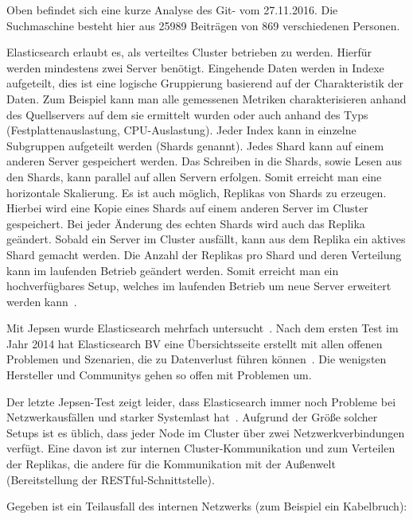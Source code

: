 

Oben befindet sich eine kurze Analyse des \gls{Git}-
 vom 27.11.2016. Die Suchmaschine besteht
hier aus 25989 Beiträgen von 869 verschiedenen Personen.

Elasticsearch erlaubt es, als verteiltes Cluster betrieben zu werden. Hierfür
werden mindestens zwei Server benötigt. Eingehende Daten werden in Indexe
aufgeteilt, dies ist eine logische Gruppierung basierend auf der Charakteristik
der Daten. Zum Beispiel kann man alle gemessenen Metriken charakterisieren
anhand des Quellservers auf dem sie ermittelt wurden oder auch anhand des Typs
(Festplattenauslastung, CPU-Auslastung). Jeder Index kann in einzelne
Subgruppen aufgeteilt werden (Shards genannt). Jedes Shard kann auf einem
anderen Server gespeichert werden. Das Schreiben in die Shards, sowie Lesen aus
den Shards, kann parallel auf allen Servern erfolgen. Somit erreicht man eine
horizontale \gls{Skalierung}. Es ist auch möglich, Replikas von Shards zu
erzeugen. Hierbei wird eine Kopie eines Shards auf einem anderen Server im
Cluster gespeichert. Bei jeder Änderung des echten Shards wird auch das Replika
geändert. Sobald ein Server im Cluster ausfällt, kann aus dem Replika ein
aktives Shard gemacht werden. Die Anzahl der Replikas pro Shard und deren
Verteilung kann im laufenden Betrieb geändert werden. Somit erreicht man ein
hochverfügbares Setup, welches im laufenden Betrieb um neue Server erweitert
werden kann~\cite{es_concepts}.

Mit \gls{Jepsen} wurde Elasticsearch mehrfach untersucht~\cite{es_jepsen_all}.
Nach dem ersten Test im Jahr 2014 hat Elasticsearch BV eine Übersichtsseite
erstellt mit allen offenen Problemen und Szenarien, die zu Datenverlust führen
können~\cite{es_resiliency}. Die wenigsten Hersteller und Communitys gehen so
offen mit Problemen um.

Der letzte Jepsen-Test zeigt leider, dass Elasticsearch immer noch Probleme bei
Netzwerkausfällen und starker Systemlast hat~\cite{jepsen_elastic}. Aufgrund
der Größe solcher Setups ist es üblich, dass jeder Node im Cluster über zwei
Netzwerkverbindungen verfügt. Eine davon ist zur internen Cluster-Kommunikation
und zum Verteilen der Replikas, die andere für die Kommunikation mit der
Außenwelt (Bereitstellung der RESTful-Schnittstelle).

Gegeben ist ein Teilausfall des internen Netzwerks (zum Beispiel ein
Kabelbruch):


